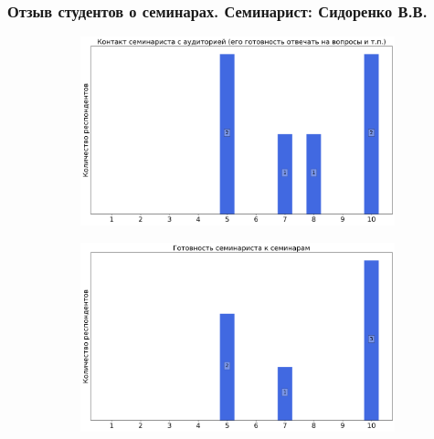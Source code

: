     \subsubsection{Отзыв студентов о семинарах. Семинарист: Сидоренко В.В.}
        \begin{figure}[H]
            \centering
            \begin{subfigure}[b]{0.45\textwidth}
                \centering
                \includegraphics[width=\textwidth]{images/2 course/Аналитическая механика/seminarists-marks-Сидоренко В.В.-0.png}
            \end{subfigure}
            \begin{subfigure}[b]{0.45\textwidth}
                \centering
                \includegraphics[width=\textwidth]{images/2 course/Аналитическая механика/seminarists-marks-Сидоренко В.В.-1.png}
            \end{subfigure}
            \begin{subfigure}[b]{0.45\textwidth}
                \centering

\end{subfigure}
\end{figure}
